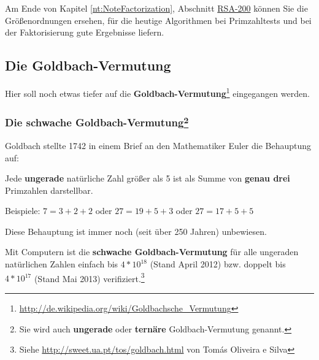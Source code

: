 \begin{refsegment}
\begin{itemize}
   Am Ende von Kapitel \ref{nt:NoteFactorization},
   Abschnitt \hyperlink{RSA-200-chap3}{RSA-200}
   können Sie die Größenordnungen ersehen, für die heutige Algorithmen
   bei Primzahltests und bei der
   Faktorisierung gute
   Ergebnisse liefern.

\end{itemize}



\hypertarget{HT-GoldbachConjecture}{}
\subsection{Die Goldbach-Vermutung}
\label{L-GoldbachConjecture}

Hier soll noch etwas tiefer auf die
\textbf{Goldbach-Vermutung}\footnote{%
        \url{http://de.wikipedia.org/wiki/Goldbachsche_Vermutung} }
eingegangen werden.


\hypertarget{HT-WeakGoldbachConjecture}{}
\subsubsection[Die schwache Goldbach-Vermutung]%
   {Die schwache Goldbach-Vermutung\footnote{%
   Sie wird auch \textbf{ungerade} oder \textbf{ternäre} Goldbach-Vermutung
   genannt.
   } }%
%
\label{L-WeakGoldbachConjecture}%

 Goldbach stellte 1742 in einem Brief an den Mathematiker Euler die Behauptung auf:

Jede \textbf{ungerade} natürliche Zahl größer als 5 ist als Summe von \textbf{genau drei} Primzahlen darstellbar.

Beispiele: $7 = 3 + 2 + 2$ oder $27 = 19 + 5 + 3$ oder $27 = 17 + 5 + 5$

 Diese Behauptung ist immer noch (seit über 250 Jahren) unbewiesen.

 Mit Computern ist die \textbf{schwache Goldbach-Vermutung} für alle
ungeraden natürlichen Zahlen einfach bis $4*10^{18}$ (Stand April 2012) bzw.
doppelt bis  $4*10^{17}$ (Stand Mai 2013) verifiziert.\footnote{%
Siehe \url{http://sweet.ua.pt/tos/goldbach.html} von Tomás Oliveira e Silva
     }


\end{refsegment}
